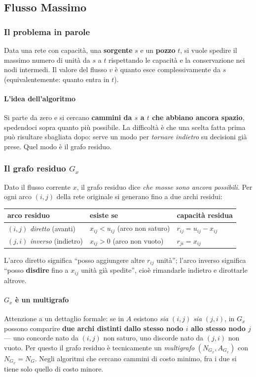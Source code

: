 \documentclass[12pt]{extarticle} %
\begin{document}
\subsection{Flusso Massimo}

\subsubsection{Il problema in parole}
Data una rete con capacità, una \textbf{sorgente} $s$ e un \textbf{pozzo} $t$, si vuole spedire il massimo numero di unità da $s$ a $t$ rispettando le capacità e la conservazione nei nodi intermedi. Il valore del flusso $v$ è quanto esce complessivamente da $s$ (equivalentemente: quanto entra in $t$).

\paragraph{L'idea dell'algoritmo}
Si parte da zero e si cercano \textbf{cammini da $s$ a $t$ che abbiano ancora spazio}, spedendoci sopra quanto più possibile. La difficoltà è che una scelta fatta prima può risultare sbagliata dopo: serve un modo per \emph{tornare indietro} su decisioni già prese. Quel modo è il grafo residuo.

\subsubsection{Il grafo residuo $G_x$}
Dato il flusso corrente $x$, il grafo residuo dice \emph{che mosse sono ancora possibili}. Per ogni arco $(i,j)$ della rete originale si generano fino a due archi residui:
\begin{center}
\begin{tabular}{lll}
\hline
\textbf{arco residuo} & \textbf{esiste se} & \textbf{capacità residua} \\
\hline
$(i,j)$ \emph{diretto} (avanti) & $x_{ij} < u_{ij}$ (arco non saturo) & $r_{ij} = u_{ij} - x_{ij}$ \\
$(j,i)$ \emph{inverso} (indietro) & $x_{ij} > 0$ (arco non vuoto) & $r_{ji} = x_{ij}$ \\
\hline
\end{tabular}
\end{center}
L'arco diretto significa ``posso aggiungere altre $r_{ij}$ unità''; l'arco inverso significa ``posso \textbf{disdire} fino a $x_{ij}$ unità già spedite'', cioè rimandarle indietro e dirottarle altrove.

\paragraph{$G_x$ è un multigrafo}
Attenzione a un dettaglio formale: se in $A$ esistono \emph{sia} $(i,j)$ \emph{sia} $(j,i)$, in $G_x$ possono comparire \textbf{due archi distinti dallo stesso nodo $i$ allo stesso nodo $j$} --- uno concorde nato da $(i,j)$ non saturo, uno discorde nato da $(j,i)$ non vuoto. Per questo il grafo residuo è tecnicamente un \emph{multigrafo} $(N_{G_x}, A_{G_x})$ con $N_{G_x} = N_G$. Negli algoritmi che cercano cammini di costo minimo, fra i due si tiene solo quello di costo minore.
\end{document}
